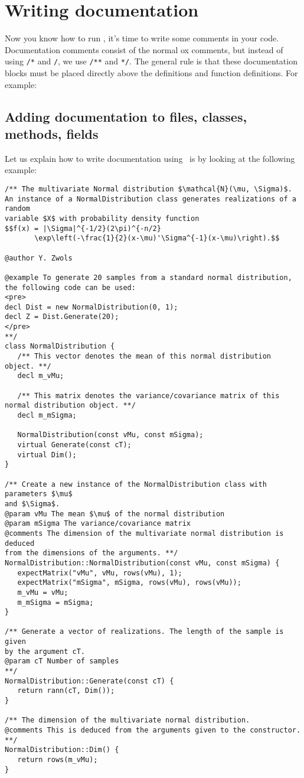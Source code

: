 \chapter{Writing documentation}
Now you know how to run \oxdoc, it's time to write some comments
in your code. Documentation comments consist of the normal ox comments,
but instead of using {\tt /*} and {\tt */}, we use
{\tt /**} and {\tt **/}. The general rule is that these documentation blocks 
must be placed directly above the definitions and function definitions. For example:


\section{Adding documentation to files, classes, methods, fields}
Let us explain how to write documentation using \oxdoc~is by looking at the following example:

\begin{lstlisting}
/** The multivariate Normal distribution $\mathcal{N}(\mu, \Sigma)$.
An instance of a NormalDistribution class generates realizations of a random
variable $X$ with probability density function 
$$f(x) = |\Sigma|^{-1/2}(2\pi)^{-n/2}
       \exp\left(-\frac{1}{2}(x-\mu)'\Sigma^{-1}(x-\mu)\right).$$

@author Y. Zwols

@example To generate 20 samples from a standard normal distribution, 
the following code can be used:
<pre>
decl Dist = new NormalDistribution(0, 1);
decl Z = Dist.Generate(20);
</pre>
**/
class NormalDistribution {
   /** This vector denotes the mean of this normal distribution object. **/
   decl m_vMu;
   
   /** This matrix denotes the variance/covariance matrix of this normal distribution object. **/
   decl m_mSigma;
   
   NormalDistribution(const vMu, const mSigma);
   virtual Generate(const cT);
   virtual Dim();
}

/** Create a new instance of the NormalDistribution class with parameters $\mu$
and $\Sigma$.
@param vMu The mean $\mu$ of the normal distribution
@param mSigma The variance/covariance matrix
@comments The dimension of the multivariate normal distribution is deduced
from the dimensions of the arguments. **/
NormalDistribution::NormalDistribution(const vMu, const mSigma) {
   expectMatrix("vMu", vMu, rows(vMu), 1);
   expectMatrix("mSigma", mSigma, rows(vMu), rows(vMu));
   m_vMu = vMu;
   m_mSigma = mSigma;
}

/** Generate a vector of realizations. The length of the sample is given
by the argument cT.
@param cT Number of samples 
**/
NormalDistribution::Generate(const cT) {
   return rann(cT, Dim());
}

/** The dimension of the multivariate normal distribution.
@comments This is deduced from the arguments given to the constructor. **/
NormalDistribution::Dim() {
   return rows(m_vMu);
}
\end{lstlisting}

